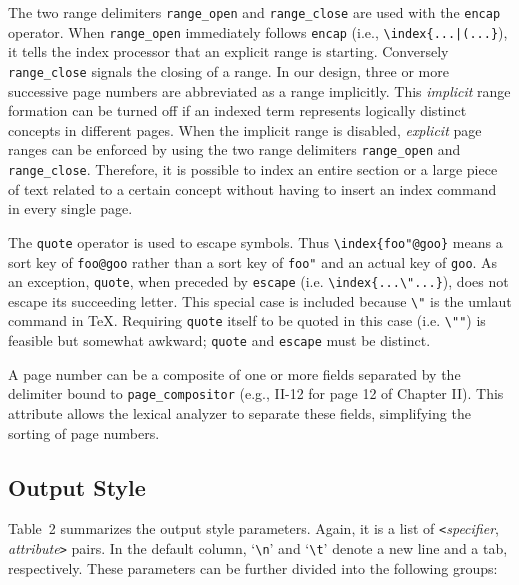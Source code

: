 The two range delimiters \verb|range_open| and \verb|range_close| are
used with the \verb|encap| operator.
When \verb|range_open| immediately follows \verb|encap|
(i.e., \verb#\index{...|(...}#),
it tells the index processor that an explicit range is starting.
Conversely \verb|range_close| signals the closing of a range.
In our design, three or more successive page numbers are abbreviated as
a range implicitly.  This {\it implicit\/} range formation can be turned
off if an indexed term represents logically distinct concepts in different
pages.  When the implicit range is disabled, {\it explicit\/} page ranges
can be enforced by using the two range delimiters
\verb|range_open| and \verb|range_close|.
Therefore, it is possible to index an entire section or a large piece
of text related to a certain concept without having to insert an index
command in every single page.

The \verb|quote| operator is used to escape symbols.
Thus \verb|\index{foo"@goo}| means a sort key of \verb|foo@goo|
rather than a sort key of \verb|foo"| and an actual key of \verb|goo|.
As an exception, \verb|quote|, when preceded by \verb|escape| (i.e.
\verb|\index{...\"...}|), does not escape its succeeding letter.
This special case is included because \verb|\"| is the umlaut
command in {\TeX}.  Requiring \verb|quote| itself to be quoted
in this case (i.e. \verb|\""|) is feasible but somewhat awkward;
\verb|quote| and \verb|escape| must be distinct.

A page number can be a composite of one or more fields
separated by the delimiter bound to \verb|page_compositor|
(e.g., II-12 for page 12 of Chapter II).
This attribute allows the lexical analyzer to separate
these fields, simplifying the sorting of page numbers.

\subsection{Output Style}
Table~2 summarizes the output style parameters.  Again, it is a list
of \verb|<|{\it specifier\/}, {\it attribute\/}\verb|>| pairs.
In the default column, `\verb|\n|' and `\verb|\t|' denote a new line
and a tab, respectively.  These parameters can be further divided into
the following groups:

